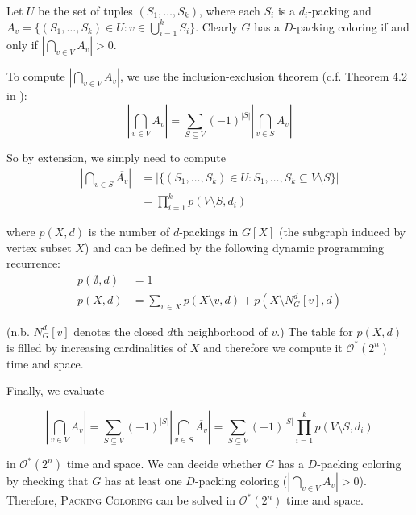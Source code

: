 \documentclass[10pt, a4paper]{article}
\theoremstyle{definition}
\newcommand{\mcO}{\mathcal{O}}
\begin{document}
Let $U$ be the set of tuples $(S_1, \dotsc, S_k)$, where each $S_i$ is a $d_i$-packing and $A_v = \{ (S_1, \dotsc, S_k) \in U : v \in \bigcup_{i=1}^{k} S_i\}$. Clearly $G$ has a $D$-packing coloring if and only if $\left | \bigcap_{v \in V} A_v \right | > 0$.

To compute $\left | \bigcap_{v \in V} A_v \right |$, we use the inclusion-exclusion theorem (c.f. Theorem 4.2 in \cite{Fomin2010}):
\begin{equation} \label{eq:incl_excl}
	\left | \bigcap_{v \in V} A_v \right | = \sum_{S \subseteq V} (-1)^{|S|} \left | \bigcap_{v \in S} \overline{A_v} \right | 
\end{equation}

So by extension, we simply need to compute 
\begin{align*}
	\left | \bigcap_{v \in S} \overline{A_v} \right | &= \left | \{ (S_1, \dotsc, S_k) \in U : S_1, \dotsc, S_k \subseteq V \setminus S \} \right | \\
													  &= \prod_{i=1}^{k} p(V \setminus S, d_i)
\end{align*}

where $p(X, d)$ is the number of $d$-packings in $G[X]$ (the subgraph induced by vertex subset $X$) and can be defined by the following dynamic programming recurrence:
\begin{align*}
	p(\emptyset, d) &= 1 \\
	p(X, d) &= \sum_{v \in X} p(X \setminus {v}, d) + p(X \setminus N_G^d[v], d)   
\end{align*}

(n.b. $N_G^d[v]$ denotes the closed $d$th neighborhood of $v$.) The table for $p(X, d)$ is filled by increasing cardinalities of $X$ and therefore we compute it $\mcO^*(2^n)$ time and space. 

Finally, we evaluate

\begin{equation} \label{eq:incl_excl_final}
	\left | \bigcap_{v \in V} A_v \right | 
	= \sum_{S \subseteq V} (-1)^{|S|} \left | \bigcap_{v \in S} \overline{A_v} \right | 
	= \sum_{S \subseteq V} (-1)^{|S|} \prod_{i=1}^{k} p(V \setminus S, d_i)
\end{equation}

in $\mcO^*(2^n)$ time and space. We can decide whether $G$ has a $D$-packing coloring by checking that $G$ has at least one $D$-packing coloring ($\left | \bigcap_{v \in V} A_v \right | > 0$). Therefore, \textsc{Packing Coloring} can be solved in $\mcO^*(2^n)$ time and space.
\end{document}
